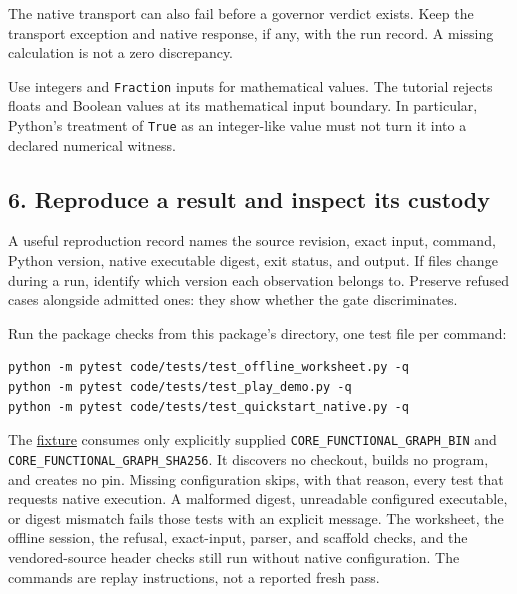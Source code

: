 \documentclass[
  11pt,
]{article}
\newcommand{\passthrough}[1]{#1}
\begin{document}
The native transport can also fail before a governor verdict exists.
Keep the transport exception and native response, if any, with the run
record. A missing calculation is not a zero discrepancy.

Use integers and \passthrough{\lstinline!Fraction!} inputs for
mathematical values. The tutorial rejects floats and Boolean values at
its mathematical input boundary. In particular, Python's treatment of
\passthrough{\lstinline!True!} as an integer-like value must not turn it
into a declared numerical witness.

\subsection{6. Reproduce a result and inspect its
custody}\label{reproduce-a-result-and-inspect-its-custody}

A useful reproduction record names the source revision, exact input,
command, Python version, native executable digest, exit status, and
output. If files change during a run, identify which version each
observation belongs to. Preserve refused cases alongside admitted ones:
they show whether the gate discriminates.

Run the package checks from this package's directory, one test file per
command:

\begin{lstlisting}
python -m pytest code/tests/test_offline_worksheet.py -q
python -m pytest code/tests/test_play_demo.py -q
python -m pytest code/tests/test_quickstart_native.py -q
\end{lstlisting}

The
\href{https://github.com/dbccpage/the_symbol_game/blob/52cb5457f6c485ba548cfd292f6012a941ed22cf/atlas/coda_atlas/symbol_game/005_pfp_practitioners_field_manual/code/tests/conftest.py}{fixture}
consumes only explicitly supplied \nolinkurl{CORE_FUNCTIONAL_GRAPH_BIN}
and \nolinkurl{CORE_FUNCTIONAL_GRAPH_SHA256}. It discovers no checkout,
builds no program, and creates no pin. Missing configuration skips, with
that reason, every test that requests native execution. A malformed
digest, unreadable configured executable, or digest mismatch fails those
tests with an explicit message. The worksheet, the offline session, the
refusal, exact-input, parser, and scaffold checks, and the
vendored-source header checks still run without native configuration.
The commands are replay instructions, not a reported fresh pass.
\end{document}
